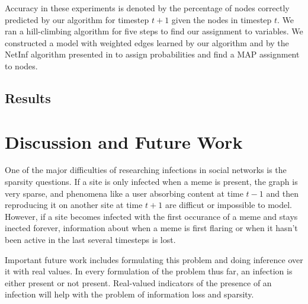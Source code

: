 \documentclass{article} %
\begin{document}
Accuracy in these experiments is denoted by the percentage of nodes correctly predicted by our algorithm for timestep $t+1$ given the nodes in timestep $t$. We ran a hill-climbing algorithm for five steps to find our assignment to variables. We constructed a model with weighted edges learned by our algorithm and by the NetInf algorithm presented in \cite{netinf} to assign probabilities and find a MAP assignment to nodes.

\subsection{Results}
\label{results}



\section{Discussion and Future Work}
\label{sec:conclusions}

One of the major difficulties of researching infections in social networks is the sparsity questions. If a site is only infected when a meme is present, the graph is very sparse, and phenomena like a user absorbing content at time $t-1$ and then reproducing it on another site at time $t+1$ are difficut or impossible to model. However, if a site becomes infected with the first occurance of a meme and stays inected forever, information about when a meme is first flaring or when it hasn't been active in the last several timesteps is lost.

Important future work includes formulating this problem and doing inference over it with real values. In every formulation of the problem thus far, an infection is either present or not present. Real-valued indicators of the presence of an infection will help with the problem of information loss and sparsity.

{}
\label{refs}

\end{document}
